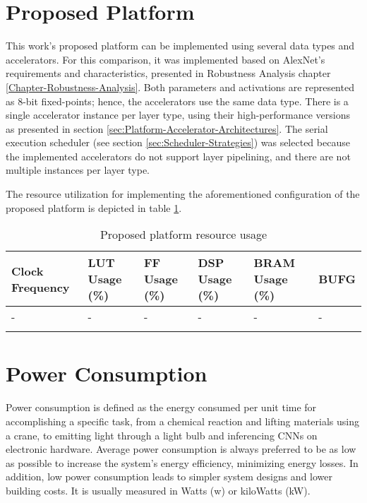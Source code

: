 \section{Proposed Platform}
\label{sec:proposed-platform-implementation}
This work's proposed platform can be implemented using several data types and accelerators. For this comparison, it was implemented based on AlexNet's requirements and characteristics, presented in Robustness Analysis chapter \ref{Chapter-Robustness-Analysis}. Both parameters and activations are represented as 8-bit fixed-points; hence, the accelerators use the same data type. There is a single accelerator instance per layer type, using their high-performance versions as presented in section \ref{sec:Platform-Accelerator-Architectures}. The serial execution scheduler (see section \ref{sec:Scheduler-Strategies}) was selected because the implemented accelerators do not support layer pipelining, and there are not multiple instances per layer type.

The resource utilization for implementing the aforementioned configuration of the proposed platform is depicted in table \ref{tab:Proposed-platform-resource-usage}.

\begin{table}[H]
	\caption{Proposed platform resource usage}
	\label{tab:Proposed-platform-resource-usage}
	\centering
	\begin{tabular}{p{2cm} p{2cm} p{2cm} p{2cm} p{2cm} p{2cm}}
		\toprule
		\textbf{Clock Frequency} & \textbf{LUT Usage (\%)} & \textbf{FF Usage (\%)} & \textbf{DSP Usage (\%)} & \textbf{BRAM Usage (\%)} & \textbf{BUFG}\\
		\midrule
			- & - & - & - & - & -\\
		\bottomrule\\
	\end{tabular}
\end{table}

\section{Power Consumption}
Power consumption is defined as the energy consumed per unit time for accomplishing a specific task, from a chemical reaction and lifting materials using a crane, to emitting light through a light bulb and inferencing CNNs on electronic hardware. Average power consumption is always preferred to be as low as possible to increase the system's energy efficiency, minimizing energy losses. In addition, low power consumption leads to simpler system designs and lower building costs. It is usually measured in Watts (w) or kiloWatts (kW).

